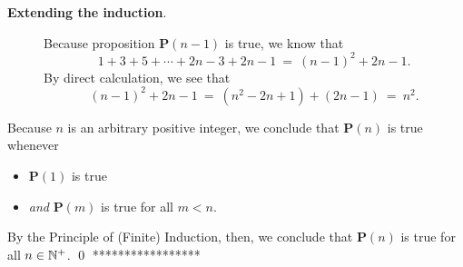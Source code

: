 {\begin{description}
\item[{\bf Extending the induction}.]
%
Because proposition {\bf P}$(n-1)$ is true, we know that
\[ 
 1 + 3 + 5 + \cdots + 2n-3 + 2n-1 \ = \ (n-1)^2 + 2n-1.  \]
By direct calculation, we see that
\[ (n-1)^2 + 2n-1 \ = \ (n^2 -2n +1) + (2n-1) \ = \ n^2. \]
\end{description}
Because $n$ is an arbitrary positive integer, we conclude that
{\bf P}$(n)$ is true whenever
\begin{itemize}
\item
{\bf P}$(1)$ is true
\item
{\em and}
{\bf P}$(m)$ is true for all $m < n$.
\end{itemize}
By the Principle of (Finite) Induction, then, we conclude that {\bf
  P}$(n)$ is true for all $n \in \mathbb{N}^+$.
\qed
*****************}

